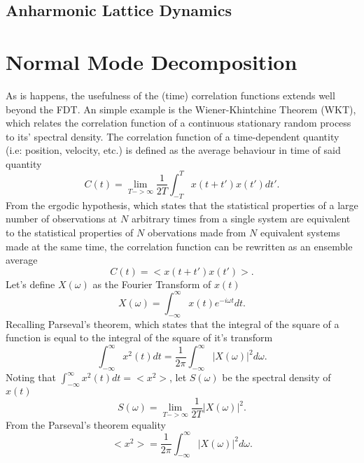 \subsection{Anharmonic Lattice Dynamics}

\section{Normal Mode Decomposition}

As is happens, the usefulness of the (time) correlation functions extends well beyond the FDT. An simple example is the Wiener-Khintchine Theorem (WKT), which relates the correlation function of a continuous stationary random process to its' spectral density. The correlation function of a time-dependent quantity (i.e: position, velocity, etc.) is defined as the average behaviour in time of said quantity \cite{mcquarrie}
%
\begin{equation}
C(t)=\lim_{T->\infty}\frac{1}{2T}\int_{-T}^{T}x(t+t')x(t')dt'.
\end{equation}
%
From the ergodic hypothesis, which states that the statistical properties of a large number of observations at $N$ arbitrary times from a single system are equivalent to the statistical properties of $N$ obervations made from $N$ equivalent systems made at the same time, the correlation function can be rewritten as an ensemble average
%
\begin{equation}
C(t)=<x(t+t')x(t')>.
\end{equation}
%
Let's define $X(\omega)$ as the Fourier Transform of $x(t)$
%
\begin{equation}
X(\omega)=\int_{-\infty}^{\infty}x(t)e^{-i\omega t}dt.
\end{equation}
%
Recalling Parseval's theorem, which states that the integral of the square of a function is equal to the integral of the square of it's transform
%
\begin{equation}
\int_{-\infty}^{\infty}x^2(t)dt=\frac{1}{2\pi}\int_{-\infty}^{\infty}|X(\omega)|^2d\omega.
\end{equation}
%
Noting that $\int_{-\infty}^{\infty}x^2(t)dt=<x^2>$, let $S(\omega)$ be the spectral density of $x(t)$
%
\begin{equation}
S(\omega)=\lim_{T->\infty}\frac{1}{2T}|X(\omega)|^2.
\end{equation}
%
From the Parseval's theorem equality
%
\begin{equation}
<x^2>=\frac{1}{2\pi}\int_{-\infty}^{\infty}|X(\omega)|^2d\omega.
\end{equation}

